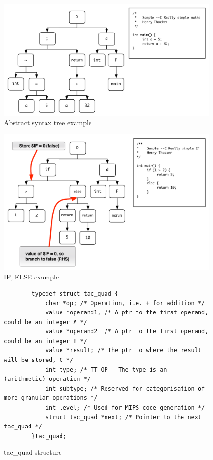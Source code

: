 \begin{figure}[p]
	\includegraphics[scale=0.7]{ast-include.pdf}
	\caption{Abstract syntax tree example}
	\label{fig:ast}
\end{figure}

\begin{figure}[p]
	\includegraphics[scale=0.7]{if-include.pdf}
	\caption{IF, ELSE example}
	\label{fig:if}
\end{figure}

\begin{figure}[p]
	\begin{verbatim}
		typedef struct tac_quad {
			char *op; /* Operation, i.e. + for addition */
			value *operand1; /* A ptr to the first operand, could be an integer A */
			value *operand2  /* A ptr to the first operand, could be an integer B */
			value *result; /* The ptr to where the result will be stored, C */
			int type; /* TT_OP - The type is an (arithmetic) operation */
			int subtype; /* Reserved for categorisation of more granular operations */
			int level; /* Used for MIPS code generation */
			struct tac_quad *next; /* Pointer to the next tac_quad */		
		}tac_quad;
	\end{verbatim}
	\caption{tac\_quad structure}
	\label{fig:tacquad}
\end{figure}

